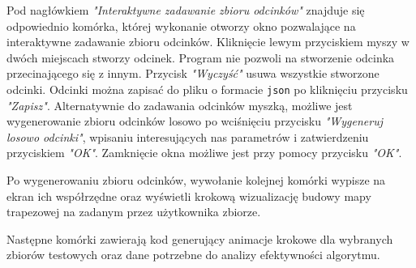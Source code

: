 \documentclass[11pt,a4paper]{article}
\begin{document}
Pod nagłówkiem \emph{"Interaktywne zadawanie zbioru odcinków"}
znajduje się odpowiednio komórka, której wykonanie otworzy
okno pozwalające na interaktywne zadawanie zbioru odcinków.
Kliknięcie lewym przyciskiem myszy w dwóch miejscach stworzy odcinek. 
Program nie pozwoli na stworzenie odcinka przecinającego się z innym.
Przycisk \emph{"Wyczyść"} usuwa wszystkie stworzone odcinki.
Odcinki można zapisać do pliku o formacie \verb|json| po kliknięciu
przycisku \emph{"Zapisz"}. Alternatywnie do zadawania odcinków myszką,
możliwe jest wygenerowanie zbioru odcinków losowo po wciśnięciu
przycisku \emph{"Wygeneruj losowo odcinki"}, wpisaniu interesujących
nas parametrów i zatwierdzeniu przyciskiem \emph{"OK"}. Zamknięcie
okna możliwe jest przy pomocy przycisku \emph{"OK"}.

Po wygenerowaniu zbioru odcinków, wywołanie kolejnej komórki
wypisze na ekran ich współrzędne oraz wyświetli krokową
wizualizację budowy mapy trapezowej na zadanym przez użytkownika
zbiorze.

Następne komórki zawierają kod generujący animacje krokowe
dla wybranych zbiorów testowych oraz dane potrzebne do
analizy efektywności algorytmu.
\end{document}
